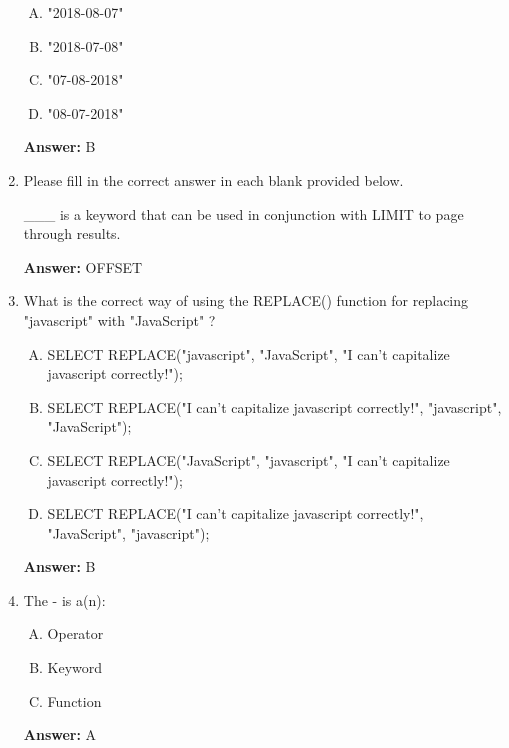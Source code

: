 \documentclass[12pt]{article}
\begin{document}
\begin{enumerate}[1.]
    \bigskip

    \begin{enumerate}[A.]
        \item "2018-08-07"
        \item "2018-07-08"
        \item "07-08-2018"
        \item "08-07-2018"
    \end{enumerate}

    \bigskip

    \textbf{Answer:} B

    \item

    Please fill in the correct answer in each blank provided below.

    \bigskip

    \_\_\_  is a keyword that can be used in conjunction with LIMIT to page through results.

    \bigskip

    \textbf{Answer:} OFFSET


    \item

    What is the correct way of using the REPLACE() function for replacing "javascript" with "JavaScript" ?

    \bigskip

    \begin{enumerate}[A.]
        \item SELECT REPLACE("javascript", "JavaScript", "I can't capitalize javascript correctly!");
        \item SELECT REPLACE("I can't capitalize javascript correctly!", "javascript", "JavaScript");
        \item SELECT REPLACE("JavaScript", "javascript", "I can't capitalize javascript correctly!");
        \item SELECT REPLACE("I can't capitalize javascript correctly!", "JavaScript", "javascript");
    \end{enumerate}

    \bigskip

    \textbf{Answer:} B

    \item

    The - is a(n):

    \bigskip

    \begin{enumerate}[A.]
        \item Operator
        \item Keyword
        \item Function

    \end{enumerate}

    \bigskip

    \textbf{Answer:} A



\end{enumerate}
\end{document}
